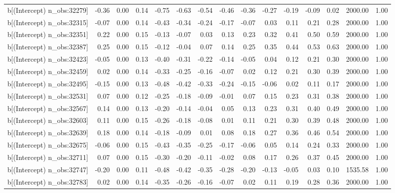 \begin{table}[ht]
\begin{tabular}{rrrrrrrrrrrrrrr}
  b[(Intercept) n\_obs:32279] & -0.36 & 0.00 & 0.14 & -0.75 & -0.63 & -0.54 & -0.46 & -0.36 & -0.27 & -0.19 & -0.09 & 0.02 & 2000.00 & 1.00 \\ 
  b[(Intercept) n\_obs:32315] & -0.07 & 0.00 & 0.14 & -0.43 & -0.34 & -0.24 & -0.17 & -0.07 & 0.03 & 0.11 & 0.21 & 0.28 & 2000.00 & 1.00 \\ 
  b[(Intercept) n\_obs:32351] & 0.22 & 0.00 & 0.15 & -0.13 & -0.07 & 0.03 & 0.13 & 0.23 & 0.32 & 0.41 & 0.50 & 0.59 & 2000.00 & 1.00 \\ 
  b[(Intercept) n\_obs:32387] & 0.25 & 0.00 & 0.15 & -0.12 & -0.04 & 0.07 & 0.14 & 0.25 & 0.35 & 0.44 & 0.53 & 0.63 & 2000.00 & 1.00 \\ 
  b[(Intercept) n\_obs:32423] & -0.05 & 0.00 & 0.13 & -0.40 & -0.31 & -0.22 & -0.14 & -0.05 & 0.04 & 0.12 & 0.21 & 0.30 & 2000.00 & 1.00 \\ 
  b[(Intercept) n\_obs:32459] & 0.02 & 0.00 & 0.14 & -0.33 & -0.25 & -0.16 & -0.07 & 0.02 & 0.12 & 0.21 & 0.30 & 0.39 & 2000.00 & 1.00 \\ 
  b[(Intercept) n\_obs:32495] & -0.15 & 0.00 & 0.13 & -0.48 & -0.42 & -0.33 & -0.24 & -0.15 & -0.06 & 0.02 & 0.11 & 0.17 & 2000.00 & 1.00 \\ 
  b[(Intercept) n\_obs:32531] & 0.07 & 0.00 & 0.12 & -0.25 & -0.18 & -0.09 & -0.01 & 0.07 & 0.15 & 0.23 & 0.31 & 0.38 & 2000.00 & 1.00 \\ 
  b[(Intercept) n\_obs:32567] & 0.14 & 0.00 & 0.13 & -0.20 & -0.14 & -0.04 & 0.05 & 0.13 & 0.23 & 0.31 & 0.40 & 0.49 & 2000.00 & 1.00 \\ 
  b[(Intercept) n\_obs:32603] & 0.11 & 0.00 & 0.15 & -0.26 & -0.18 & -0.08 & 0.01 & 0.11 & 0.21 & 0.30 & 0.39 & 0.48 & 2000.00 & 1.00 \\ 
  b[(Intercept) n\_obs:32639] & 0.18 & 0.00 & 0.14 & -0.18 & -0.09 & 0.01 & 0.08 & 0.18 & 0.27 & 0.36 & 0.46 & 0.54 & 2000.00 & 1.00 \\ 
  b[(Intercept) n\_obs:32675] & -0.06 & 0.00 & 0.15 & -0.43 & -0.35 & -0.25 & -0.17 & -0.06 & 0.05 & 0.14 & 0.24 & 0.33 & 2000.00 & 1.00 \\ 
  b[(Intercept) n\_obs:32711] & 0.07 & 0.00 & 0.15 & -0.30 & -0.20 & -0.11 & -0.02 & 0.08 & 0.17 & 0.26 & 0.37 & 0.45 & 2000.00 & 1.00 \\ 
  b[(Intercept) n\_obs:32747] & -0.20 & 0.00 & 0.11 & -0.48 & -0.42 & -0.35 & -0.28 & -0.20 & -0.13 & -0.05 & 0.03 & 0.10 & 1535.58 & 1.00 \\ 
  b[(Intercept) n\_obs:32783] & 0.02 & 0.00 & 0.14 & -0.35 & -0.26 & -0.16 & -0.07 & 0.02 & 0.11 & 0.19 & 0.28 & 0.36 & 2000.00 & 1.00 \\ 

\end{tabular}
\end{table}
